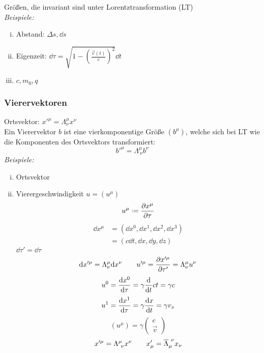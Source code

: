 Größen, die invariant sind unter Lorentztransformation (LT)\\[5pt]
\emph{Beispiele:}
\begin{enumerate}[i)]
	\item Abstand: $ \Delta s, \dd s $
	\item Eigenzeit: $ \dd \tau = \sqrt{1 - \left(\frac{\vec{v}(t)}{c}\right)^2} \dd t $ 
	\item $ c, m_0, q $
\end{enumerate}

\subsubsection{Vierervektoren}

Ortsvektor: $ x'^{\mu} = \Lambda^{\mu}_{\nu} x^{\nu} $\\[5pt]
Ein Vierervektor $ b $ ist eine vierkomponentige Größe $ (b^{\mu}) $, welche sich bei LT wie die Komponenten des Ortsvektors transformiert:
\begin{equation*}
b'^{\mu} = \Lambda^{\mu}_{\ \nu} b^{\nu}
\end{equation*}
\emph{Beispiele:}
\begin{enumerate}[i)]
	\item Ortsvektor
	\item Vierergeschwindigkeit $ u = (u^{\mu}) $\\
	\begin{equation*}
	u^{\mu} \defeq \prt{x^{\mu}}{\tau}
	\end{equation*}
	\begin{align*}
	\dd x^{\mu} &= (\dd x^0, \dd x^1, \dd x^2, \dd x^3)\\
	&= (c \dd t, \dd x, \dd y, \dd z)
	\end{align*}
	$ \dd \tau' = \dd \tau $
	\begin{equation*}
	\textrm{d} x'^{\mu} = \Lambda^{\mu}_{\nu} \textrm{d} x^{\nu} \qquad u'^{\mu} = \frac{\partial x'^{\mu}}{\partial \tau'} = \Lambda^{\mu}_{\nu} u^{\nu}
	\end{equation*}
	\begin{equation*}
	u^{0} = \frac{\textrm{d} x^{0}}{\textrm{d} \tau} = \gamma \frac{\textrm{d} }{\textrm{d} t} ct = \gamma c
	\end{equation*}
	\begin{equation*}
	u^{1} = \frac{\textrm{d} x^1}{\textrm{d} \tau} = \gamma \frac{\textrm{d} x}{\textrm{d} t} = \gamma v_x
	\end{equation*}
	\begin{equation*}
	(u^{\mu}) = \gamma \begin{pmatrix}
	c \\ \vec{v}
	\end{pmatrix}
	\end{equation*}
	\begin{equation*}
	x'^{\mu} = \Lambda^{\mu}_{\ \nu} x^{\nu} \qquad x'_{\mu} = \overline{\Lambda}_{\mu}^{\ \nu} x_\nu 
	\end{equation*}
\end{enumerate}
